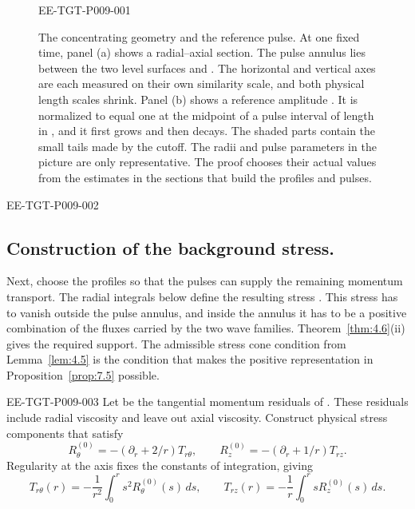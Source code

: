 %
\begin{figure}[htbp]
 \centering
 \begin{EESegment}{EE-TGT-P009-001}
 \caption{The concentrating geometry and the reference pulse. At one fixed time, panel (a) shows
 a radial--axial section. The pulse annulus lies between the two level surfaces
  and . The horizontal and vertical axes are
 each measured on their own similarity scale, and both physical length scales shrink. Panel (b)
 shows a reference amplitude . It is normalized to equal one at the
 midpoint of a pulse interval of length  in
 , and it first grows and then decays. The shaded parts contain the small
 tails made by the cutoff. The radii and pulse parameters in the picture are only representative.
 The proof chooses their actual values from the estimates in the sections that build the profiles
 and pulses.}
 \label{fig:3}
 \end{EESegment}
\end{figure}

\begin{EESegment}{EE-TGT-P009-002}
\subsection{Construction of the background stress.}\label{sec:3.2}
Next, choose the profiles  so that the pulses can supply the remaining
momentum transport. The radial integrals below define the resulting
stress . This stress has to vanish outside the pulse annulus, and inside the
annulus it has to be a positive combination of the fluxes carried by the two wave families.
Theorem~\ref{thm:4.6}(ii) gives the required support. The admissible stress cone condition from
Lemma~\ref{lem:4.5} is the condition that makes the positive representation in
Proposition~\ref{prop:7.5} possible.
\end{EESegment}

\begin{EESegment}{EE-TGT-P009-003}
Let  be the tangential momentum residuals of
. These residuals include radial viscosity and leave
out axial viscosity. Construct physical stress components
 that satisfy
\[
 R_\theta^{(0)}=-(\partial_r+2/r)T_{r\theta},
 \qquad
 R_z^{(0)}=-(\partial_r+1/r)T_{rz}.
\]
Regularity at the axis fixes the constants of integration, giving
\[
 T_{r\theta}(r)=-\frac1{r^2}\int_0^r s^2R_\theta^{(0)}(s)\,ds,
 \qquad
 T_{rz}(r)=-\frac1r\int_0^r sR_z^{(0)}(s)\,ds.
\]
\end{EESegment}

